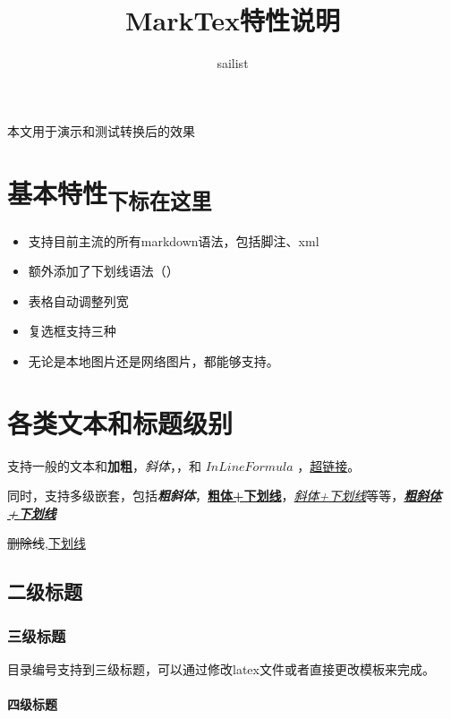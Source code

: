 \documentclass{article}%
\title{MarkTex特性说明}%
\author{sailist}%
\begin{document}
%
\normalsize%
\maketitle%
%
\tableofcontents
\newpage%

%
%
%

%

%
本文用于演示和测试转换后的效果%
\section{基本特性\textsubscript{下标在这里}}%

%

%
\begin{itemize}%
\item%
支持目前主流的所有markdown语法，包括脚注、xml%
\item%
额外添加了下划线语法（）%
\item%
表格自动调整列宽%
\item%
复选框支持三种%
\item%
无论是本地图片还是网络图片，都能够支持。%
\end{itemize}%
%

%

%
\section{各类文本和标题级别}%

%
支持一般的文本和\textbf{加粗}，\textit{斜体}，，和 $InLine Formula$ ，\href{http://github.com}{超链接}。%

%
同时，支持多级嵌套，包括\textbf{\textit{粗斜体}}，\textbf{\underline{粗体+下划线}}，\textit{\underline{斜体+下划线}}等等，\textbf{\textit{\underline{粗斜体+下划线}}}%

%
\sout{删除线},\underline{下划线}%

%
\subsection{二级标题}%

%

%
\subsubsection{三级标题}%

%
目录编号支持到三级标题，可以通过修改latex文件或者直接更改模板来完成。%

%
\paragraph{四级标题}%
\end{document}
